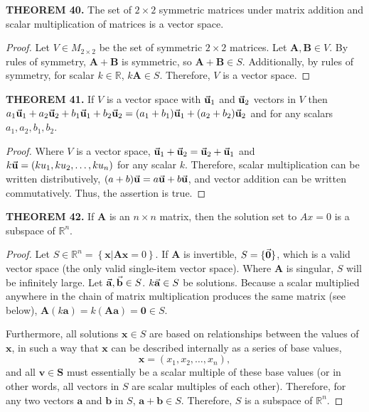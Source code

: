 \documentclass[12pt]{article}
\newcommand{\mat}[1]{\mathbf{#1}}
\newcommand{\theorem}[2]{\textbf{THEOREM #1.} #2}
\begin{document}
\theorem{40}{The set of $2 \times 2$ symmetric matrices under matrix addition and scalar multiplication of matrices is a vector space.}

\begin{proof}
Let $V \in M_{2 \times 2}$ be the set of symmetric $2 \times 2$ matrices. Let $\mat{A},\mat{B} \in V$. By rules of symmetry, $\mat{A+B}$ is symmetric, so $\mat{A+B} \in S$. Additionally, by rules of symmetry, for scalar $k \in \mathbb{R}$, $k\mat{A} \in S$. Therefore, $V$ is a vector space. 
\end{proof}

\theorem{41}{If $V$ is a vector space with $\va{u}_1$ and $\va{u}_2$ vectors in $V$ then $a_1 \va{u}_1 + a_2 \va{u}_2 + b_1 \va{u}_1 + b_{2} \va{u}_{2} = (a_1 + b_1) \va{u}_1 + (a_2 + b_2) \va{u}_2$ and for any scalars $a_1, a_2, b_1, b_2$.}

\begin{proof}
Where $V$ is a vector space, $\va{u}_{1} + \va{u}_{2} = \va{u}_{2} + \va{u}_{1}$ and $k\va{u} = (ku_{1}, ku_{2}, \dots, ku_n)$ for any scalar $k$. Therefore, scalar multiplication can be written distributively, $(a+b)\va{u} = a\va{u} + b\va{u}$, and vector addition can be written commutatively. Thus, the assertion is true.
\end{proof}

\theorem{42}{If $\mat{A}$ is an $n \times n$ matrix, then the solution set to $Ax = 0$ is a subspace of $\mathbb{R}^{n}$.}

\begin{proof}
Let $S \in \mathbb{R}^{n} = \left\{\left. \mat{x} \right| \mat{Ax} = 0 \right\}.$ If $\mat{A}$ is invertible, $S = \{\va{0}\}$, which is a valid vector space (the only valid single-item vector space). Where $\mat{A}$ is singular, $S$ will be infinitely large. Let $\va{a}, \va{b} \in S$. $k\va{a} \in S$ be solutions. Because a scalar multiplied anywhere in the chain of matrix multiplication produces the same matrix (see below), $\mat{A}(k\mat{a}) = k(\mat{Aa}) = \mat{0} \in S$. 

Furthermore, all solutions $\mat{x} \in S$ are based on relationships between the values of $\mat{x}$, in such a way that $\mat{x}$ can be described internally as a series of base values,
$$\mat{x} = ( x_1, x_2, \dots, x_n ),$$
and all $\mat{v} \in \mat{S}$ must essentially be a scalar multiple of these base values (or in other words, all vectors in $S$ are scalar multiples of each other). Therefore, for any two vectors $\mat{a}$ and $\mat{b}$ in $S$, $\mat{a+b} \in S$. Therefore, $S$ is a subspace of $\mathbb{R}^{n}$. 
\end{proof}
\end{document}
